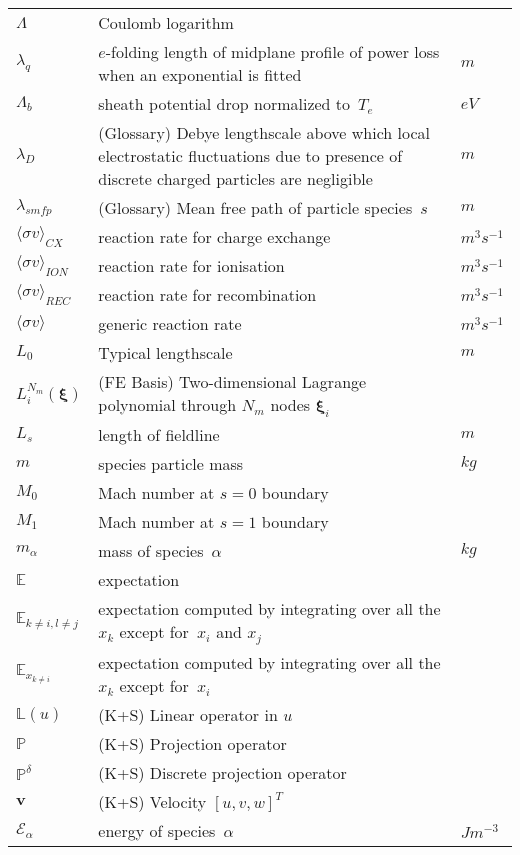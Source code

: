 \begin{longtable}{|p{3.0cm}|p{10.0cm}|p{3.0cm}|}
$\Lambda$ & Coulomb logarithm & \\
$\lambda_q$ & $e$-folding length of midplane profile of power loss when an exponential is fitted & $m$ \\
$\Lambda_b$ & sheath potential drop normalized to~$T_e$  & $eV$ \\
$\lambda_D$ & (Glossary) Debye lengthscale above which local electrostatic fluctuations due to presence of discrete charged particles are negligible  & $m$ \\
$\lambda_{smfp}$ & (Glossary) Mean free path of particle species~$s$ & $m$  \\
$\langle \sigma v \rangle_{CX}$ & reaction rate for charge exchange  & $m^3 s^{-1}$ \\
$\langle \sigma v \rangle_{ION}$ & reaction rate for ionisation  & $m^3 s^{-1}$ \\
$\langle \sigma v \rangle_{REC}$ & reaction rate for recombination  & $m^3 s^{-1}$ \\
$\langle\sigma v\rangle$ & generic reaction rate  & $m^3 s^{-1}$ \\
$L_0$ & Typical lengthscale  & $m$ \\
$L_i^{N_m}(\boldsymbol{\xi})$ &  (FE Basis) Two-dimensional Lagrange polynomial through $N_m$ nodes ${\mathbf \xi}_i$ & \\
$L_s$ & length of fieldline  & $m$ \\
$m$ & species particle mass & $kg$ \\
$M_0$ & Mach number at $s=0$ boundary & \\
$M_1$ & Mach number at $s=1$ boundary & \\
$m_\alpha$ & mass of species~$\alpha$ & $kg$ \\
$\mathbb{E}$ & expectation  & \\
$\mathbb{E}_{k\neq i, l\neq j}$ & expectation computed by integrating over all the $x_k$ except for~$x_i$ and  $x_j$  & \\
$\mathbb{E}_{x_{k\neq i}}$ & expectation computed by integrating over all the $x_k$ except for~$x_i$  & \\
$\mathbb{L}(u)$ &  (K+S) Linear operator in $u$ & \\
$\mathbb{P}$ &  (K+S) Projection operator & \\
$\mathbb{P}^{\delta}$ &  (K+S) Discrete projection operator & \\
${\mathbf v}$ &  (K+S) Velocity $[u, v, w]^T$ & \\
$\mathcal{E}_\alpha$ & energy of species~$\alpha$ & $J m^{-3}$ \\

\end{longtable}
